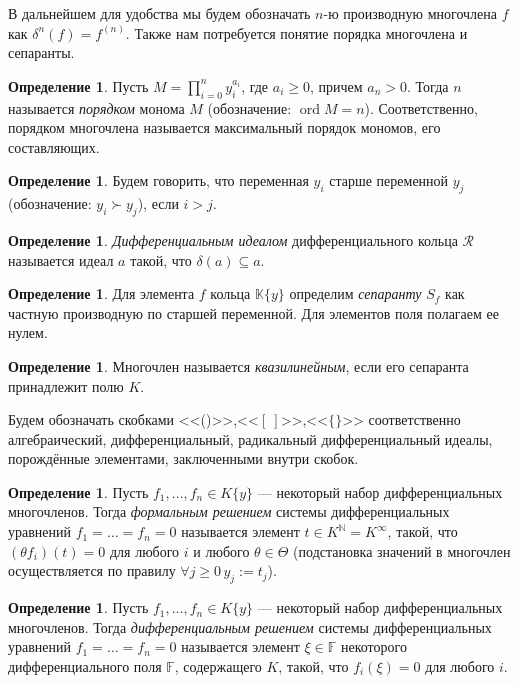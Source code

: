 \documentclass[16pt]{article}
\DeclareMathOperator{\ord}{ord}
\renewcommand{\ge}{\geqslant} %
\theoremstyle{plain1}
\theoremstyle{plain2}
\theoremstyle{plain}
\theoremstyle{plain3}
\theoremstyle{definition}
\newtheorem{definition}[theorem2]{Определение}
\theoremstyle{remark}
\begin{document}
В дальнейшем для удобства мы будем обозначать $n$-ю производную многочлена $f$ как $\delta^n(f)=f^{(n)}$. Также нам потребуется понятие порядка многочлена и сепаранты.
\begin{definition}
Пусть $M = \prod\limits_{i=0}^ny_i^{a_i}$, где $a_i \ge 0$, причем $a_n > 0$. Тогда $n$ называется \emph{порядком} монома $M$ (обозначение: $\ord M=n$). Соответственно, порядком многочлена называется максимальный порядок
мономов, его составляющих.
\end{definition}
\begin{definition}
Будем говорить, что переменная $y_i$ старше переменной $y_j$ (обозначение: $y_i \succ y_j$), если $i>j$.
\end{definition}
\begin{definition}
\emph{Дифференциальным идеалом} дифференциального кольца $\mathcal{R}$ называется идеал $a$ такой, что $\delta(a)\subseteq a$.
\end{definition}


\begin{definition}
Для элемента $f$ кольца $\mathbb{K}\{y\}$ определим \emph{сепаранту} $S_f$
как частную производную по старшей переменной. Для элементов поля полагаем ее нулем.
\end{definition}

\begin{definition} Многочлен называется \emph{квазилинейным}, если
его сепаранта принадлежит полю $K$.
\end{definition}



Будем обозначать скобками <<()>>,<<$[~]$>>,<<$\{\}$>> соответственно
алгебраический, дифференциальный, радикальный дифференциальный
идеалы, порождённые элементами, заключенными внутри скобок.


\begin{definition}
Пусть $f_1,\ldots,f_n\in K\{y\}$ --- некоторый набор
дифференциальных многочленов. Тогда \emph{формальным решением}
системы дифференциальных уравнений $f_1=\ldots =f_n=0$ называется
элемент $t\in K^{\mathbb{N}}= K^{\infty}$, такой, что $ (\theta f_i)(t)=0$ для
любого $i$ и любого $\theta\in\Theta$ (подстановка значений в
многочлен осуществляется по правилу $\forall j\ge 0 \, y_j:=t_j$).
\end{definition}




\begin{definition}
Пусть $f_1,\ldots,f_n\in K\{y\}$ --- некоторый
набор дифференциальных многочленов. Тогда \emph{дифференциальным
решением} системы дифференциальных уравнений $f_1=\ldots =f_n=0$
называется элемент $\xi \in \mathbb{F}$ некоторого дифференциального
поля $\mathbb{F}$, содержащего $K$, такой, что $ f_i(\xi)=0$ для
любого $i$.
\end{definition}
\end{document}
